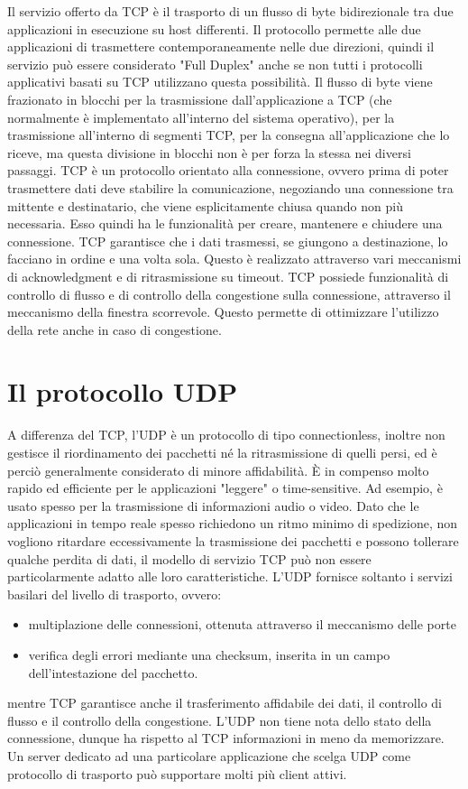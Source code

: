 Il servizio offerto da TCP è il trasporto di un flusso di byte bidirezionale tra due applicazioni in esecuzione su host differenti. Il protocollo permette alle due applicazioni di trasmettere contemporaneamente nelle due direzioni, quindi il servizio può essere considerato "Full Duplex" anche se non tutti i protocolli applicativi basati su TCP utilizzano questa possibilità.
Il flusso di byte viene frazionato in blocchi per la trasmissione dall'applicazione a TCP (che normalmente è implementato all'interno del sistema operativo), per la trasmissione all'interno di segmenti TCP, per la consegna all'applicazione che lo riceve, ma questa divisione in blocchi non è per forza la stessa nei diversi passaggi.
TCP è un protocollo orientato alla connessione, ovvero prima di poter trasmettere dati deve stabilire la comunicazione, negoziando una connessione tra mittente e destinatario, che viene esplicitamente chiusa quando non più necessaria. Esso quindi ha le funzionalità per creare, mantenere e chiudere una connessione.
TCP garantisce che i dati trasmessi, se giungono a destinazione, lo facciano in ordine e una volta sola. Questo è realizzato attraverso vari meccanismi di acknowledgment e di ritrasmissione su timeout.
TCP possiede funzionalità di controllo di flusso e di controllo della congestione sulla connessione, attraverso il meccanismo della finestra scorrevole. Questo permette di ottimizzare l'utilizzo della rete anche in caso di congestione.

\section{Il protocollo UDP}
A differenza del TCP, l'UDP è un protocollo di tipo connectionless, inoltre non gestisce il riordinamento dei pacchetti né la ritrasmissione di quelli persi, ed è perciò generalmente considerato di minore affidabilità. È in compenso molto rapido ed efficiente per le applicazioni "leggere" o time-sensitive. Ad esempio, è usato spesso per la trasmissione di informazioni audio o video. Dato che le applicazioni in tempo reale spesso richiedono un ritmo minimo di spedizione, non vogliono ritardare eccessivamente la trasmissione dei pacchetti e possono tollerare qualche perdita di dati, il modello di servizio TCP può non essere particolarmente adatto alle loro caratteristiche. L'UDP fornisce soltanto i servizi basilari del livello di trasporto, ovvero:
\begin{itemize}
    \item multiplazione delle connessioni, ottenuta attraverso il meccanismo delle porte
    \item verifica degli errori mediante una checksum, inserita in un campo dell'intestazione del pacchetto.
\end{itemize}
mentre TCP garantisce anche il trasferimento affidabile dei dati, il controllo di flusso e il controllo della congestione.
L'UDP non tiene nota dello stato della connessione, dunque ha rispetto al TCP informazioni in meno da memorizzare. Un server dedicato ad una particolare applicazione che scelga UDP come protocollo di trasporto può supportare molti più client attivi.

